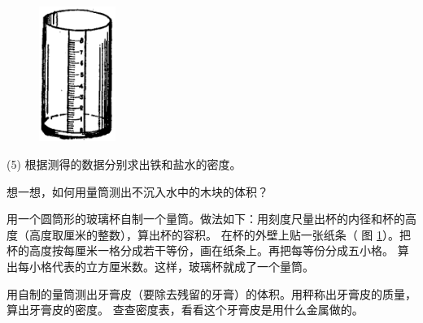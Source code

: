 \begin{figure}
    \centering
    \includegraphics[width=2.5cm]{../pic/czwl1-ch4-5}
    \caption{}\label{fig:4-5}
\end{figure}


(5) 根据测得的数据分别求出铁和盐水的密度。

 想一想，如何用量筒测出不沉入水中的木块的体积？




用一个圆筒形的玻璃杯自制一个量筒。做法如下：用刻度尺量出杯的内径和杯的高度（高度取厘米的整数），算出杯的容积。
在杯的外壁上贴一张纸条（ 图 \ref{fig:4-5}）。把杯的高度按每厘米一格分成若干等份，画在纸条上。再把每等份分成五小格。
算出每小格代表的立方厘米数。这样，玻璃杯就成了一个量筒。

用自制的量筒测出牙膏皮（要除去残留的牙膏）的体积。用秤称出牙膏皮的质量，算出牙膏皮的密度。
查查密度表，看看这个牙膏皮是用什么金属做的。

